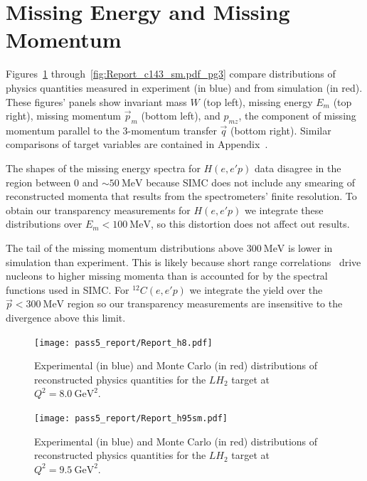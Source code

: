 \section{Missing Energy and Missing Momentum}

Figures~\ref{fig:Report_h8.pdf_pg3} through~\ref{fig:Report_c143_sm.pdf_pg3}
compare distributions of physics quantities measured in experiment (in blue)
and from simulation (in red).
These figures' panels show
invariant mass $W$ (top left),
missing energy $E_m$ (top right),
missing momentum $\vec{p}_m$ (bottom left),
and $p_{mz}$, the component of missing momentum parallel to the 3-momentum
transfer $\vec{q}$ (bottom right).
Similar comparisons of target variables are contained in
Appendix~\label{app:distributions}.


The shapes of the missing energy spectra for $H(e,e'p)$ data disagree in the
region between 0 and $\sim\SI{50}{\mega\electronvolt}$
because SIMC does not include any smearing of reconstructed momenta that
results from the spectrometers' finite resolution.
To obtain our transparency measurements for $H(e,e'p)$ we integrate these
distributions over $E_{m}<\SI{100}{\mega\electronvolt}$, so this distortion
does not affect out results.


The tail of the missing momentum distributions above
$\SI{300}{\mega\electronvolt}$ is lower in simulation than experiment.
This is likely because short range correlations~\cite{Fomin_2017}
drive nucleons to higher missing momenta than is accounted for by the
spectral functions used in SIMC.
For ${}^{12}C(e,e'p)$ we integrate the yield over the
$\vec{p}<\SI{300}{\mega\electronvolt}$ region so
our transparency measurements are insensitive to the
divergence above this limit.


\begin{figure}[!h]
    \centering
    \texttt{[image: pass5\_report/Report\_h8.pdf]}
    \caption{
            Experimental (in blue) and Monte Carlo (in red) distributions of
            reconstructed physics quantities for
            the $LH_2$ target at $Q^2=\SI{8.0}{\giga\electronvolt\squared}$.
            }
    \label{fig:Report_h8.pdf_pg3}
\end{figure}


\begin{figure}[!h]
    \centering
    \texttt{[image: pass5\_report/Report\_h95sm.pdf]}
    \caption{
            Experimental (in blue) and Monte Carlo (in red) distributions of
            reconstructed physics quantities for
            the $LH_2$ target at $Q^2=\SI{9.5}{\giga\electronvolt\squared}$.
            }
    \label{fig:Report_h95sm.pdf_pg3}
\end{figure}


